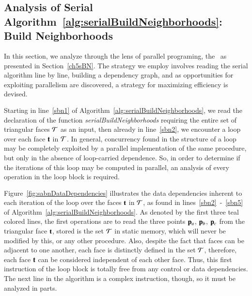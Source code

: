 %
%
\subsection{Analysis of Serial Algorithm~\ref{alg:serialBuildNeighborhoods}: Build Neighborhoods}
\label{ch6sBNPssASABN}
In this section, we analyze through the lens of parallel programing, the~ as presented in Section~\ref{ch5sBN}. The strategy we employ involves reading the serial algorithm line by line, building a dependency graph, and as opportunities for exploiting parallelism are discovered, a strategy for maximizing efficiency is devised.

Starting in line~\ref{sbn1} of Algorithm~\ref{alg:serialBuildNeighborhoods}, we read the declaration of the function \textit{serialBuildNeighborhoods} requiring the entire set of triangular faces $\mathcal{T}$ as an input, then already in line~\ref{sbn2}, we encounter a loop over each face $\mathbf{t}$ in $\mathcal{T}$. In general, concurrency found in the structure of a loop may be completely exploited by a parallel implementation of the same procedure, but only in the absence of loop-carried dependence. So, in order to determine if the iterations of this loop may be computed in parallel, an analysis of every operation in the loop block is required.

Figure~\ref{fig:sabnDataDependencies} illustrates the data dependencies inherent to each iteration of the loop over the faces $\mathbf{t}$ in $\mathcal{T}$, as found in lines~\ref{sbn2}~-~\ref{sbn5} of Algorithm~\ref{alg:serialBuildNeighborhoods}. As denoted by the first three teal colored lines, the first operations are to read the three points $\mathbf{p}_a$, $\mathbf{p}_b$, $\mathbf{p}_c$ from the triangular face $\mathbf{t}$, stored is the set $\mathcal{T}$ in static memory, which will never be modified by this, or any other procedure. Also, despite the fact that faces can be adjacent to one another, each face is distinctly defined in the set $\mathcal{T}$, therefore, each face $\mathbf{t}$ can be considered independent of each other face. Thus, this first instruction of the loop block is totally free from any control or data dependencies. The next line in the algorithm is a complex instruction, though, so it must be analyzed in parts.

